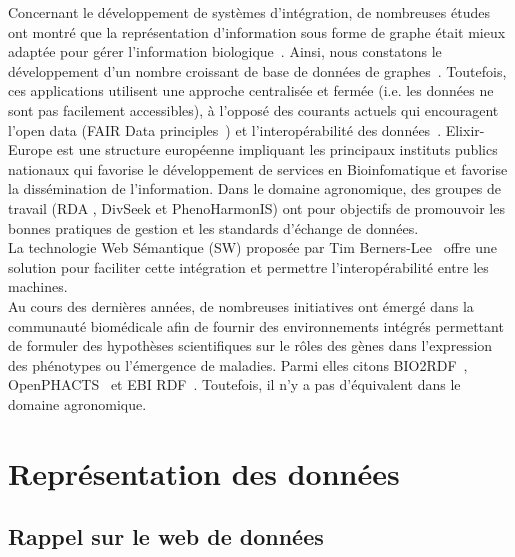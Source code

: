  Concernant le développement de systèmes d'intégration, de nombreuses études ont montré que la représentation d’information sous forme de graphe était mieux adaptée pour gérer l’information biologique~\cite{Have2013,Lysenko2016}.  Ainsi, nous constatons le développement d'un nombre croissant de base de données de graphes~\cite{Hassani-Pak2016,Pareja-tobes2015}. Toutefois, ces applications utilisent une approche centralisée et fermée (i.e. les données ne sont pas facilement accessibles), à l’opposé des courants actuels qui encouragent l’open data (FAIR Data principles~\cite{Wilkinson2016a}) et l’interopérabilité des données~\cite{DzaleYeumo2017,Leonelli2017}. Elixir-Europe est une structure européenne impliquant les principaux instituts publics nationaux qui favorise le développement de services en Bioinfomatique et favorise la dissémination de l’information. Dans le domaine agronomique, des groupes de travail (RDA , DivSeek et PhenoHarmonIS) ont pour objectifs de promouvoir les bonnes pratiques de gestion et les standards d’échange de données.\\

La technologie Web Sémantique (SW) proposée par Tim Berners-Lee~\cite{berners2001semweb} offre une solution pour faciliter cette intégration et permettre l'interopérabilité entre les machines. \\

Au cours des dernières années, de nombreuses initiatives ont émergé dans la communauté biomédicale afin de fournir des environnements intégrés permettant de formuler des hypothèses scientifiques sur le rôles des gènes dans l’expression des phénotypes ou l’émergence de maladies. Parmi elles citons BIO2RDF~\cite{Belleau2008a}, OpenPHACTS~\cite{williams2012} et EBI RDF~\cite{Jupp2014}. Toutefois, il n’y a pas d’équivalent dans le domaine agronomique. \\





\section{Représentation des données}\label{interrogation}

\subsection{Rappel sur le web de données}

